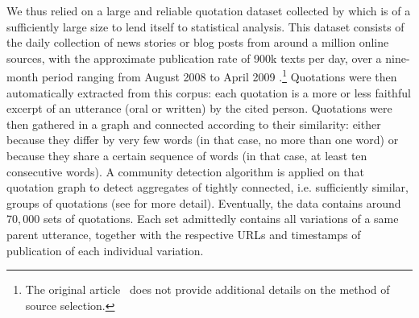 We thus relied on a large and reliable quotation dataset collected by \citet{Leskovec09} which 
is of a sufficiently large size to lend itself to statistical analysis.
This dataset consists of the daily collection of news stories or blog posts from around a million online sources, with the approximate publication rate of 900k texts per day, over a nine-month period ranging from August 2008 to April 2009 \cite{Leskovec09-url}.\footnote{The original article~\citep{Leskovec09} does not provide additional details on the method of source selection.}
Quotations were then automatically extracted from this corpus: each quotation is a more or less faithful excerpt of an utterance (oral or written) by the cited person. Quotations were then gathered in a graph and connected according to their similarity: either because they differ by very few words (in that case, no more than one word) or because they share a certain sequence of words (in that case, at least ten consecutive words). A community detection algorithm is applied on that quotation graph to detect aggregates of tightly connected, i.e. sufficiently similar, groups of quotations (see \citet{Leskovec09} for more detail).  Eventually, the data contains around $70,000$ sets of quotations. Each set admittedly contains all variations of a same parent utterance, together with the respective URLs and timestamps of publication of each individual variation. %

